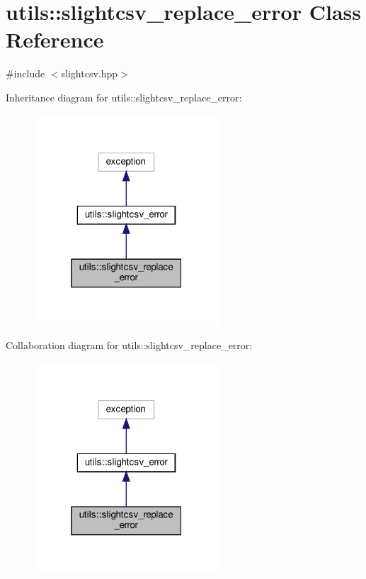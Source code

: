 \hypertarget{classutils_1_1slightcsv__replace__error}{}\section{utils\+:\+:slightcsv\+\_\+replace\+\_\+error Class Reference}
\label{classutils_1_1slightcsv__replace__error}


{\ttfamily \#include $<$slightcsv.\+hpp$>$}



Inheritance diagram for utils\+:\+:slightcsv\+\_\+replace\+\_\+error\+:
\nopagebreak
\begin{figure}[H]
\begin{center}
\leavevmode
\includegraphics[width=196pt]{classutils_1_1slightcsv__replace__error__inherit__graph}
\end{center}
\end{figure}


Collaboration diagram for utils\+:\+:slightcsv\+\_\+replace\+\_\+error\+:
\nopagebreak
\begin{figure}[H]
\begin{center}
\leavevmode
\includegraphics[width=196pt]{classutils_1_1slightcsv__replace__error__coll__graph}
\end{center}
\end{figure}


